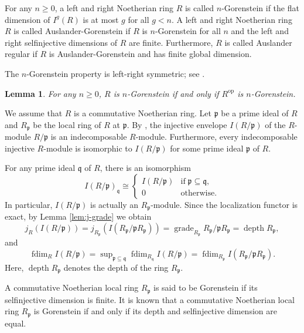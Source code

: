 \documentclass[a4paper,reqno]{amsart}
\numberwithin{equation}{section}
\theoremstyle{plain}
\newtheorem{lem}[thm]{Lemma}
\theoremstyle{definition}
\theoremstyle{remark}
\DeclareMathOperator{\grade}{grade}
\DeclareMathOperator{\depth}{depth}
\DeclareMathOperator{\fdim}{fdim}
\DeclareMathOperator{\op}{op}
\newcommand{\fkp}{\mathfrak{p}}
\newcommand{\fkq}{\mathfrak{q}}
\renewcommand{\-}{\mbox{-}}
\begin{document}
For any \(n\geq 0\), a left and right Noetherian ring 
\(R\) is called {\(n\)-Gorenstein} 
if the flat dimension of \(I^g(R)\) is at most \(g\) for all \(g<n\). 
A left and right Noetherian ring \(R\) is called {Auslander-Gorenstein} 
if \(R\) is \(n\)-Gorenstein for all \(n\) and 
the left and right selfinjective dimensions of \(R\)  are finite. 
Furthermore, \(R\) is called {Auslander regular} 
if \(R\) is Auslander-Gorenstein and has finite global dimension.


The \(n\)-Gorenstein property is left-right symmetric; 
see \cite[Theorem 3.7]{FGR75}.


\begin{lem} \label{lem:left-right}
For any \(n\ge 0\), \(R\) is \(n\)-Gorenstein if and only if \(R^{\op}\) is \(n\)-Gorenstein. 
\end{lem}



We assume that \(R\) is a commutative Noetherian ring.
Let \(\fkp\) be a prime ideal of \(R\) and
\(R_\fkp\) be the local ring of \(R\) at  \(\fkp\).
By \cite{Mat58}, the injective envelope \(I(R/\fkp)\) of the 
\(R\)-module \(R/\fkp\) is an indecomposable  \(R\)-module.
Furthermore, every indecomposable injective \(R\)-module is isomorphic to 
\(I(R/\fkp)\) for some prime ideal \(\fkp\)  of \(R\).

For any prime ideal \(\fkq\) of \(R\), there is an isomorphism
\begin{equation*}
    I(R/\fkp)_\fkq \cong
    \begin{cases}
        I(R/\fkp) & \textrm{if}\;\fkp\subseteq\fkq ,\\
        0 & \textrm{otherwise}.
    \end{cases}
\end{equation*}
In particular, \(I(R/\fkp)\) is actually an \(R_\fkp\)-module.
Since the localization functor is exact, 
by Lemma \ref{lem:j-grade} we obtain
\begin{equation*}
    j_R(I(R/\fkp))=j_{R_\fkp}(I(R_\fkp/\fkp R_\fkp))
    =\grade_{R_\fkp}R_\fkp/\fkp R_\fkp=\depth R_\fkp,
\end{equation*}
and
\begin{equation*}
    \fdim_R I(R/\fkp)=\sup\nolimits_{\fkp\subseteq\fkq}\fdim_{R_\fkq}I(R/\fkp)=\fdim_{R_\fkp}I(R_\fkp/\fkp R_\fkp).
\end{equation*}
Here, \(\depth R_\fkp\) denotes the depth of the  ring \(R_\fkp\).

A commutative Noetherian local ring \(R_\fkp\) is said to be 
Gorenstein if its selfinjective dimension  is finite.
It is known that a commutative Noetherian local ring \(R_\fkp\) is Gorenstein if 
and only if its depth and selfinjective dimension are equal.
\end{document}
